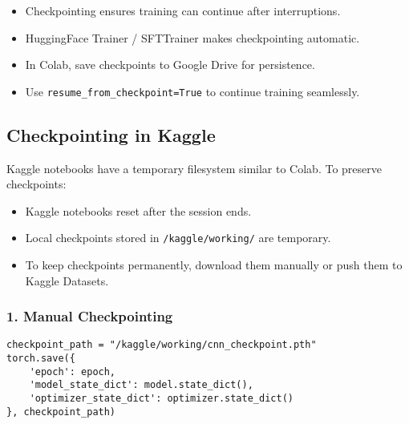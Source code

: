 \documentclass[a4paper, 12pt]{article}
\begin{document}
\begin{tcolorbox}[colback=green!5!white, colframe=green!75!black, title=Summary]
\begin{itemize}
    \item Checkpointing ensures training can continue after interruptions.
    \item HuggingFace Trainer / SFTTrainer makes checkpointing automatic.
    \item In Colab, save checkpoints to Google Drive for persistence.
    \item Use \texttt{resume\_from\_checkpoint=True} to continue training seamlessly.
\end{itemize}
\end{tcolorbox}



\newpage
\subsection*{Checkpointing in Kaggle}

Kaggle notebooks have a temporary filesystem similar to Colab. To preserve checkpoints:

\begin{tcolorbox}[colback=blue!5!white, colframe=blue!75!black, title=Important Note]
\begin{itemize}
    \item Kaggle notebooks reset after the session ends.
    \item Local checkpoints stored in \texttt{/kaggle/working/} are temporary.
    \item To keep checkpoints permanently, download them manually or push them to Kaggle Datasets.
\end{itemize}
\end{tcolorbox}

\subsubsection*{1. Manual Checkpointing}

\begin{tcolorbox}[colback=yellow!5!white, colframe=yellow!75!black, title=Example: Save to Kaggle Working Folder]
\begin{verbatim}
checkpoint_path = "/kaggle/working/cnn_checkpoint.pth"
torch.save({
    'epoch': epoch,
    'model_state_dict': model.state_dict(),
    'optimizer_state_dict': optimizer.state_dict()
}, checkpoint_path)
\end{verbatim}
\end{tcolorbox}
\end{document}
